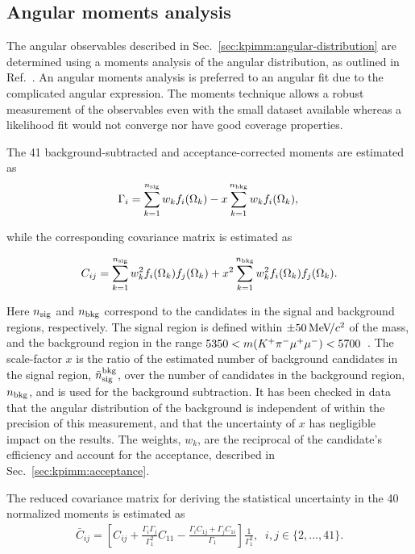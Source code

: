 \subsection{Angular moments analysis}
\label{sec:kpimm:angular-analysis}

The angular observables described in Sec.~\ref{sec:kpimm:angular-distribution} are determined using a moments analysis of the angular distribution, as outlined in Ref.~\cite{biplab}. An angular moments analysis is preferred to an angular fit due to the complicated angular expression. The moments technique allows a robust measurement of the observables even with the small dataset available whereas a likelihood fit would not converge nor have good coverage properties.

The 41 background-subtracted and acceptance-corrected moments are estimated as
\begin{equation}
 \label{eqn:moments}
\Gamma_i =  \sum_{k=1}^{n_{\rm sig}} w_{k}f_i(\Omega_k)  - x\sum_{k=1}^{n_{\rm bkg}} w_{k}f_i(\Omega_k),\\
\end{equation}

\noindent while the corresponding covariance matrix is estimated as

\begin{equation}
 \label{eqn:covariance}
 C_{ij} = \sum_{k=1}^{n_{\rm sig}} w^{2}_{k}f_i(\Omega_k)f_j(\Omega_k)   + x^2\sum_{k=1}^{n_{\rm bkg}} w^{2}_{k}f_i(\Omega_k)f_j(\Omega_k).
\end{equation}

\noindent Here $n_{\rm sig}$ and $n_{\rm bkg}$ correspond to the candidates in the signal and background regions, respectively. The signal region is defined within $\pm 50{\mathrm{\,Me\kern -0.1em V\!/}c^2}$ of the \Bz mass, and the background region in the range $5350<m({{K}^+}{{\pi}^-}{\mu^+}{\mu^-})<5700$~\mevcc. The scale-factor $x$ is the ratio of the estimated number of background candidates in the signal region, $\tilde{n}^{\rm bkg}_{\rm sig}$, over the number of candidates in the background region, $n_{\rm bkg}$, and is used for the background subtraction.
It has been checked in data that the angular distribution of the background is independent of \mkpimm within the precision of this measurement, and that the uncertainty of $x$ has negligible impact on the results.
The weights, $w_{k}$, are the reciprocal of the candidate's efficiency and account for the acceptance, described in Sec.~\ref{sec:kpimm:acceptance}.

The reduced covariance matrix for deriving the statistical uncertainty in the 40 normalized moments is estimated as
\begin{align}
\label{eqn:red_cov_def}
\bar{C}_{ij} = \left[C_{ij} + \frac{\Gamma_i \Gamma_j}{\Gamma_1^2} C_{11} - \frac{\Gamma_i C_{1j} + \Gamma_j C_{1i}}{\Gamma_1}\right] \frac{1}{\Gamma_1^2},  \;\; i,j \in \{2,...,41\}.
\end{align}

